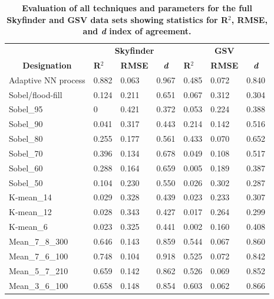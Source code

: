 \documentclass[final,3p,times,authoryear]{elsarticle}
\begin{document}
\begin{table}[!htbp]
\caption{\bf Evaluation of all techniques and parameters for the full Skyfinder and GSV data sets showing statistics for R$^{2}$, RMSE, and \textit{d} index of agreement. \label{tab:evalall}}     
\begin{tabular}{ l l l l l l l }
\multicolumn{1}{c}{\textbf{~}}
& \multicolumn{3}{c}{\textbf{Skyfinder}}
& \multicolumn{3}{c}{\textbf{GSV}}
\\ 
 \multicolumn{1}{c|}{\textbf{Designation}}
& \textbf{R$^{2}$} 
& \textbf{RMSE} 
& \multicolumn{1}{c|}{\textbf{\textit{d}}}
& \textbf{R$^{2}$} 
& \textbf{RMSE}  
& \multicolumn{1}{c}{\textbf{\textit{d}}}
\\ \hline


Adaptive NN process&0.882&0.063&0.967&0.485&0.072&0.840 \\
\hline
Sobel/flood-fill&0.124&0.211&0.651&0.067&0.312&0.304 \\
\hline
Sobel\_95       &0    &0.421&0.372&0.053&0.224&0.388 \\
Sobel\_90       &0.041&0.317&0.443&0.214&0.142&0.516 \\
Sobel\_80       &0.255&0.177&0.561&0.433&0.070&0.652 \\
Sobel\_70       &0.396&0.134&0.678&0.049&0.108&0.517 \\
Sobel\_60       &0.288&0.164&0.659&0.005&0.189&0.387 \\
Sobel\_50       &0.104&0.230&0.550&0.026&0.302&0.287 \\
K-mean\_14      &0.029&0.328&0.439&0.023&0.233&0.307 \\
K-mean\_12      &0.028&0.343&0.427&0.017&0.264&0.299 \\
K-mean\_6       &0.023&0.325&0.441&0.002&0.160&0.408 \\
Mean\_7\_8\_300 &0.646&0.143&0.859&0.544&0.067&0.860 \\
Mean\_7\_6\_100	&0.748&0.104&0.918&0.525&0.072&0.842 \\
Mean\_5\_7\_210	&0.659&0.142&0.862&0.526&0.069&0.852 \\
Mean\_3\_6\_100	&0.658&0.148&0.854&0.603&0.062&0.866 \\
\hline
\end{tabular}
\end{table}
\end{document}
